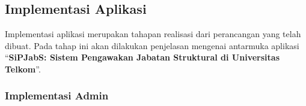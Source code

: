\chapter{\babEmpat}

\section{Implementasi Aplikasi}

Implementasi aplikasi merupakan tahapan realisasi dari perancangan yang telah dibuat. Pada tahap ini akan dilakukan penjelasan mengenai antarmuka aplikasi “\textbf{SiPJabS: Sistem Pengawakan Jabatan Struktural di Universitas Telkom}”. 

\subsection{Implementasi Admin}

